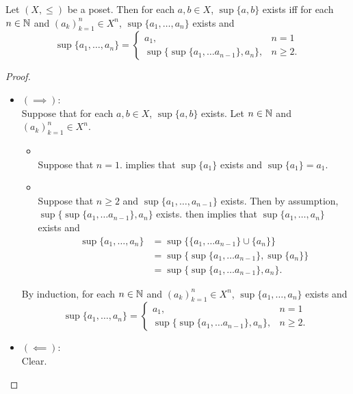 \documentclass{book}
\begin{document}
	\begin{ex} 
		Let $(X, \leq)$ be a poset. Then for each $a,b \in X$, $\sup \{a,b\}$ exists iff for each $n \in \mathbb{N}$ and $(a_k)_{k=1}^n \in X^n$, $\sup \{a_1, \ldots, a_n\}$ exists and
		\[
		\sup \{a_1, \ldots, a_n\} = 
		\begin{cases}
			a_1, & n = 1 \\
			\sup \bigg\{ \sup \{a_1, \ldots a_{n-1}\} , a_n \bigg \} , & n \geq 2.
		\end{cases}
		\]
	\end{ex}
	
	\begin{proof}\
		\begin{itemize}
			\item $(\implies)$: \\
			Suppose that for each $a,b \in X$, $\sup \{a,b\}$ exists. Let $n \in \mathbb{N}$ and $(a_k)_{k=1}^n \in X^n$.
			\begin{itemize}
				\item {} \\
				Suppose that $n = 1$.  implies that $\sup \{a_1 \}$ exists and $\sup \{a_1\} = a_1$. 
				\item \tbf{Induction Step:} \\
				Suppose that $n \geq 2$ and $\sup \{a_1, \ldots, a_{n-1}\}$ exists. Then by assumption, $\sup \bigg\{ \sup \{a_1, \ldots a_{n-1}\} , a_n \bigg \}$ exists.  then implies that $\sup \{a_1, \ldots, a_n\}$ exists and 
				\begin{align*}
					\sup \{a_1, \ldots, a_n\}
					& = \sup \bigg \{ \{a_1, \ldots a_{n-1}\} \cup \{a_n\} \bigg \} \\
					& = \sup \bigg \{ \sup \{a_1, \ldots a_{n-1}\} , \sup \{a_n\} \bigg \} \\
					& = \sup \bigg\{ \sup \{a_1, \ldots a_{n-1}\} , a_n \bigg \}.
				\end{align*} 
			\end{itemize}
			By induction, for each $n \in \mathbb{N}$ and $(a_k)_{k=1}^n \in X^n$, $\sup \{a_1, \ldots, a_n\}$ exists and 
			\[
			\sup \{a_1, \ldots, a_n\} = 
			\begin{cases}
				a_1, & n = 1 \\
				\sup \bigg\{ \sup \{a_1, \ldots a_{n-1}\} , a_n \bigg \} , & n \geq 2.
			\end{cases}
			\] 
			\item $(\impliedby)$: \\
			Clear.
		\end{itemize}
	\end{proof}
	
\end{document}
